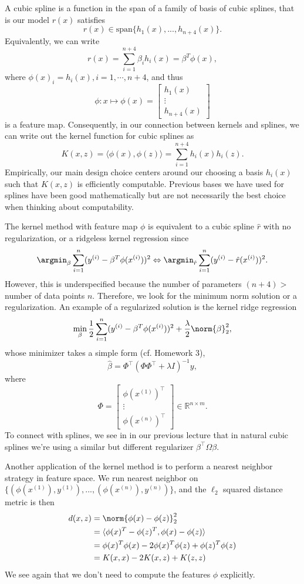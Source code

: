 A cubic spline is a function in the span of a family of basis of cubic splines, that is our model $r(x)$ satisfies
$$
 r(x) \in \mbox{span}\{ h_1(x), ..., h_{n+4}(x) \}.
 $$
Equivalently, we can write
$$
r(x) = \sum_{i=1}^{n+4} \beta_i h_i(x) = \beta^T \phi(x),
$$
where $\phi(x)_i = h_i(x), i =1, \cdots, n+4$, and thus
$$
\phi: x \mapsto  \phi(x) = \begin{bmatrix} h_1(x) \\ \vdots \\ h_{n+4}(x) \end{bmatrix}
$$
is a feature map. Consequently, in our connection between kernels and splines, we can write out the kernel function for cubic splines as 
$$K(x,z) = \langle \phi(x) , \phi(z) \rangle = \sum_{i=1}^{n+4}  h_i(x) h_i(z).$$
Empirically, our main design choice centers around our choosing a basis $h_i(x)$ such that $K(x,z)$ is efficiently computable. Previous bases we have used for splines have been good mathematically but are not necessarily the best choice when thinking about computability.

The kernel method with feature map $\phi$ is equivalent to a cubic spline $\hat{r}$ with no regularization, or a ridgeless kernel regression since
$$ 
\argmin_{\beta} \sum_{i=1}^{n} (y^{(i)} - \beta^T \phi(x^{(i)}) )^2 \Leftrightarrow \argmin_{\hat{r}} \sum_{i=1}^{n} (y^{(i)} - \hat{r}(x^{(i)}))^2. $$
However, this is underspecified because the number of parameters $(n + 4) > $ number of data points $n$. Therefore, we look for the minimum norm solution or a regularization. An example of a regularized solution is the kernel ridge regression
$$ \min_{\beta} \frac{1}{2} \sum_{i=1}^{n} (y^{(i)} - \beta^T \phi(x^{(i)}) )^2 + \frac{\lambda}{2} \norm{\beta}_2^2, $$
whose minimizer takes a simple form (cf. Homework 3),
$$
\hat \beta = \Phi^\top (\Phi \Phi^\top + \lambda I)^{-1} y,
$$
where
$$
\Phi = \begin{bmatrix}
	\phi(x^{(1)})^\top \\
	\vdots  \\
	\phi(x^{(n)})^\top
\end{bmatrix} \in \mathbb{R}^{n \times m}.
$$
To connect with splines, we see in in our previous lecture that in natural cubic splines we're using a similar but different regularizer $\beta^\top \Omega \beta$.

Another application of the kernel method is to perform a nearest neighbor strategy in feature space. We run nearest neighbor on $ \{ (\phi(x^{(1)}), y^{(1)}), ..., (\phi(x^{(n)}), y^{(n)})\}$, and the $\ell_2$ squared distance metric is then
\begin{align*} 
d(x,z) &= \norm{\phi(x) - \phi(z)}_2^2 \\
&= \langle \phi(x)^T - \phi(z)^T, \phi(x) - \phi(z) \rangle \\
&= \phi(x)^T \phi(x) - 2 \phi(x)^T \phi(z) + \phi(z)^T \phi(z) \\
&= K(x,x) - 2K(x,z) + K(z,z)
\end{align*}
We see again that we don't need to compute the features $\phi$ explicitly.

